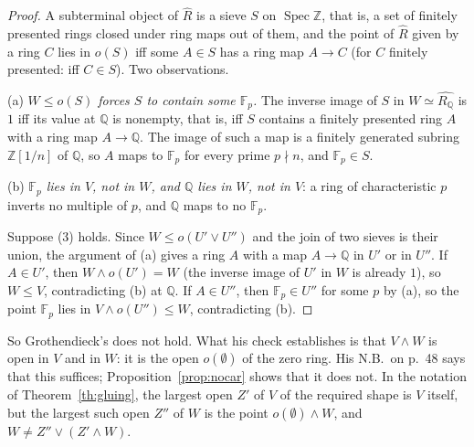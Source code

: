 \begin{proof}
A subterminal object of $\widehat R$ is a sieve $S$ on $\operatorname{Spec}\mathbb Z$, that is, a set of finitely presented rings closed under ring maps out of them, and the point of $\widehat R$ given by a ring $C$ lies in $o(S)$ iff some $A\in S$ has a ring map $A\to C$ (for $C$ finitely presented: iff $C\in S$). Two observations.

(a) \emph{$W\le o(S)$ forces $S$ to contain some $\mathbb F_p$.} The inverse image of $S$ in $W\simeq\widehat{R_{\mathbb Q}}$ is $1$ iff its value at $\mathbb Q$ is nonempty, that is, iff $S$ contains a finitely presented ring $A$ with a ring map $A\to\mathbb Q$. The image of such a map is a finitely generated subring $\mathbb Z[1/n]$ of $\mathbb Q$, so $A$ maps to $\mathbb F_p$ for every prime $p\nmid n$, and $\mathbb F_p\in S$.

(b) \emph{$\mathbb F_p$ lies in $V$, not in $W$, and $\mathbb Q$ lies in $W$, not in $V$}: a ring of characteristic $p$ inverts no multiple of $p$, and $\mathbb Q$ maps to no $\mathbb F_p$.

Suppose (3) holds. Since $W\le o(U'\vee U'')$ and the join of two sieves is their union, the argument of (a) gives a ring $A$ with a map $A\to\mathbb Q$ in $U'$ or in $U''$. If $A\in U'$, then $W\wedge o(U') = W$ (the inverse image of $U'$ in $W$ is already $1$), so $W\le V$, contradicting (b) at $\mathbb Q$. If $A\in U''$, then $\mathbb F_p\in U''$ for some $p$ by (a), so the point $\mathbb F_p$ lies in $V\wedge o(U'')\le W$, contradicting (b).
\end{proof}

So Grothendieck's  does not hold. What his check establishes is that $V\wedge W$ is open in $V$ and in $W$: it is the open $o(\emptyset)$ of the zero ring. His N.B.\ on p.~48 says that this suffices; Proposition~\ref{prop:nocar} shows that it does not. In the notation of Theorem~\ref{th:gluing}, the largest open $Z'$ of $V$ of the required shape is $V$ itself, but the largest such open $Z''$ of $W$ is the point $o(\emptyset)\wedge W$, and $W\ne Z''\vee(Z'\wedge W)$.

